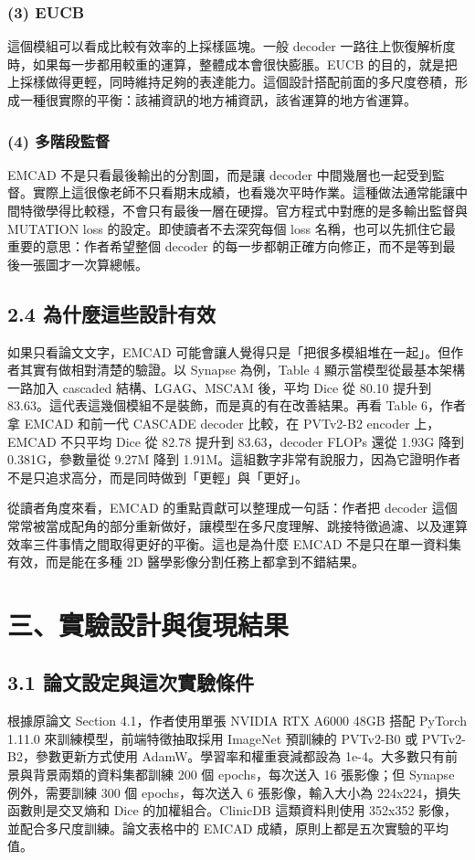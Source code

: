 \documentclass[a4paper,12pt,twocolumn]{article}
\begin{document}
\subsubsection*{(3) EUCB}
這個模組可以看成比較有效率的上採樣區塊。一般 decoder 一路往上恢復解析度時，如果每一步都用較重的運算，整體成本會很快膨脹。EUCB 的目的，就是把上採樣做得更輕，同時維持足夠的表達能力。這個設計搭配前面的多尺度卷積，形成一種很實際的平衡：該補資訊的地方補資訊，該省運算的地方省運算。

\subsubsection*{(4) 多階段監督}
EMCAD 不是只看最後輸出的分割圖，而是讓 decoder 中間幾層也一起受到監督。實際上這很像老師不只看期末成績，也看幾次平時作業。這種做法通常能讓中間特徵學得比較穩，不會只有最後一層在硬撐。官方程式中對應的是多輸出監督與 MUTATION loss 的設定。即使讀者不去深究每個 loss 名稱，也可以先抓住它最重要的意思：作者希望整個 decoder 的每一步都朝正確方向修正，而不是等到最後一張圖才一次算總帳。

\subsection*{2.4 為什麼這些設計有效}
如果只看論文文字，EMCAD 可能會讓人覺得只是「把很多模組堆在一起」。但作者其實有做相對清楚的驗證。以 Synapse 為例，Table 4 顯示當模型從最基本架構一路加入 cascaded 結構、LGAG、MSCAM 後，平均 Dice 從 80.10 提升到 83.63。這代表這幾個模組不是裝飾，而是真的有在改善結果。再看 Table 6，作者拿 EMCAD 和前一代 CASCADE decoder 比較，在 PVTv2-B2 encoder 上，EMCAD 不只平均 Dice 從 82.78 提升到 83.63，decoder FLOPs 還從 1.93G 降到 0.381G，參數量從 9.27M 降到 1.91M。這組數字非常有說服力，因為它證明作者不是只追求高分，而是同時做到「更輕」與「更好」。

從讀者角度來看，EMCAD 的重點貢獻可以整理成一句話：作者把 decoder 這個常常被當成配角的部分重新做好，讓模型在多尺度理解、跳接特徵過濾、以及運算效率三件事情之間取得更好的平衡。這也是為什麼 EMCAD 不是只在單一資料集有效，而是能在多種 2D 醫學影像分割任務上都拿到不錯結果。

\section*{三、實驗設計與復現結果}
\subsection*{3.1 論文設定與這次實驗條件}
根據原論文 Section 4.1，作者使用單張 NVIDIA RTX A6000 48GB 搭配 PyTorch 1.11.0 來訓練模型，前端特徵抽取採用 ImageNet 預訓練的 PVTv2-B0 或 PVTv2-B2，參數更新方式使用 AdamW。學習率和權重衰減都設為 1e-4。大多數只有前景與背景兩類的資料集都訓練 200 個 epochs，每次送入 16 張影像；但 Synapse 例外，需要訓練 300 個 epochs，每次送入 6 張影像，輸入大小為 224x224，損失函數則是交叉熵和 Dice 的加權組合。ClinicDB 這類資料則使用 352x352 影像，並配合多尺度訓練。論文表格中的 EMCAD 成績，原則上都是五次實驗的平均值。
\end{document}
